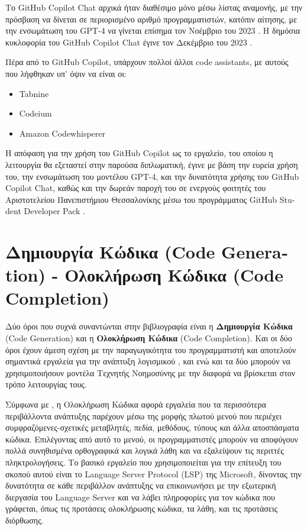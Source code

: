 Το \textlatin{GitHub Copilot Chat} αρχικά ήταν διαθέσιμο μόνο μέσω λίστας αναμονής, με την πρόσβαση να δίνεται σε περιορισμένο αριθμό προγραμματιστών, κατόπιν αίτησης, με την ενσωμάτωση του \textlatin{GPT-4} να γίνεται επίσημα τον Νοέμβριο του 2023 \cite{github2023gpt4}. Η δημόσια κυκλοφορία του \textlatin{GitHub Copilot Chat} έγινε τον Δεκέμβριο του 2023 \cite{github2023chat}.

Πέρα από το \textlatin{GitHub Copilot}, υπάρχουν πολλοί άλλοι \textlatin{code assistants}, με αυτούς που λήφθηκαν υπ' όψιν να είναι οι: 
\begin{itemize}
    \item \textlatin{Tabnine} \cite{microsoft2021tabnine, vincent2019ai}
    \item \textlatin{Codeium} \cite{forbes2024codeium}
    \item \textlatin{Amazon Codewhisperer} \cite{bays2022AWS}
\end{itemize}
Η απόφαση για την χρήση του \textlatin{GitHub Copilot} ως το εργαλείο, του οποίου η λειτουργία θα εξεταστεί στην παρούσα διπλωματική, έγινε με βάση την ευρεία χρήση του, την ενσωμάτωση του μοντέλου \textlatin{GPT-4}, και την δυνατότητα χρήσης του \textlatin{GitHub Copilot Chat}, καθώς και την δωρεάν παροχή του σε ενεργούς φοιτητές του Αριστοτελείου Πανεπιστήμιου Θεσσαλονίκης μέσω του προγράμματος \textlatin{GitHub Student Developer Pack} \cite{githubstudentpack}.

\section{Δημιουργία Κώδικα \textlatin{(Code Generation)} - Ολοκλήρωση Κώδικα \textlatin{(Code Completion)} }
\label{sec:ch1-}

Δύο όροι που συχνά συναντώνται στην βιβλιογραφία είναι η \textbf{Δημιουργία Κώδικα} \textlatin{(Code Generation)} και η \textbf{Ολοκλήρωση Κώδικα} \textlatin{(Code Completion)}. Και οι δύο όροι έχουν άμεση σχέση με την παραγωγικότητα του προγραμματιστή και αποτελούν σημαντικά εργαλεία για την ανάπτυξη λογισμικού \cite{codecomp, koester1996effect, asaduzzaman2014cscc}, και ενώ και τα δύο μπορούν να χρησιμοποιήσουν μοντέλα Τεχνητής Νοημοσύνης \cite{svyatkovskoy2020fast,raychev2014code} με την διαφορά να βρίσκεται στον τρόπο λειτουργίας τους. 

Σύμφωνα με \textlatin{\citeauthor{Omar2012}} \cite{Omar2012}, η Ολοκλήρωση Κώδικα αφορά εργαλεία που τα περισσότερα περιβάλλοντα ανάπτυξης παρέχουν μέσω της μορφής πλωτού μενού που περιέχει συμφραζόμενες-σχετικές μεταβλητές, πεδία, μεθόδους, τύπους και άλλα αποσπάσματα κώδικα. Επιλέγοντας από αυτό το μενού, οι προγραμματιστές μπορούν να αποφύγουν πολλά συνηθισμένα ορθογραφικά και λογικά λάθη και να εξαλείψουν τις περιττές πληκτρολογήσεις. Το βασικό εργαλείο που χρησιμοποιείται για την επίτευξη του σκοπού αυτού είναι το \textlatin{Language Server Protocol (LSP)} της \textlatin{Microsoft}, δίνοντας την δυνατότητα σε κάθε περιβάλλον ανάπτυξης να επικοινωνήσει με την εξωτερική διεργασία του \textlatin{Language Server} και να λάβει πληροφορίες για τον κώδικα που γράφεται, όπως τις προτάσεις ολοκλήρωσης κώδικα, τα λάθη, και τις προτάσεις διόρθωσης. \cite{Rask2022, Bunder2019}